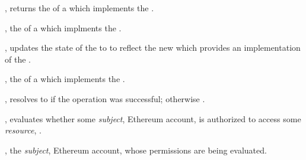 \begin{interface}
\item \specification{}

  \begin{functions}
    \item {}, returns the  of a
       which implements the .

      \begin{returns}
        \item {}, the  of a 
          which implments the .
      \end{returns}

    \item {}, updates the state of
      the  to to reflect the new  which provides
      an implementation of the .


      \begin{parameters}
        \item {}, the  of a 
          which implements the .
      \end{parameters}

      \begin{returns}
        \item {}, resolves to  if the operation was
          successful; otherwise .
      \end{returns}

    \item {},
      evaluates whether some \emph{subject}, Ethereum account, is authorized to
      access some \emph{resource}, .

      \begin{parameters}
        \item {}, the \emph{subject}, Ethereum account,
          whose permissions are being evaluated.\footnotemark{}



\end{parameters}
\end{functions}
\end{interface}

